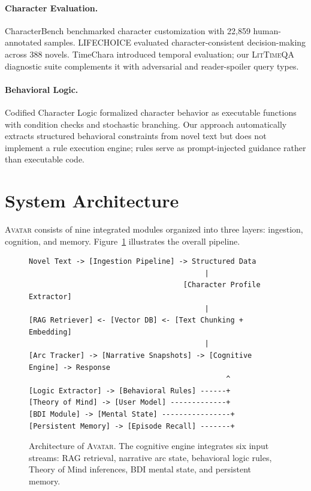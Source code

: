 \documentclass[11pt,a4paper]{article}
\begin{document}
\paragraph{Character Evaluation.}
CharacterBench \citep{characterbench2025} benchmarked character customization with 22,859 human-annotated samples.
LIFECHOICE \citep{lifechoice2024} evaluated character-consistent decision-making across 388 novels.
TimeChara \citep{ahn2024timechara} introduced temporal evaluation; our \textsc{LitTimeQA} diagnostic suite complements it with adversarial and reader-spoiler query types.

\paragraph{Behavioral Logic.}
Codified Character Logic \citep{codifiedlogic2025} formalized character behavior as executable functions with condition checks and stochastic branching.
Our approach automatically extracts structured behavioral constraints from novel text but does not implement a rule execution engine; rules serve as prompt-injected guidance rather than executable code.

\section{System Architecture}
\label{sec:architecture}

\textsc{Avatar} consists of nine integrated modules organized into three layers: ingestion, cognition, and memory.
Figure~\ref{fig:architecture} illustrates the overall pipeline.

\begin{figure}[t]
\centering
\small
\begin{verbatim}
Novel Text -> [Ingestion Pipeline] -> Structured Data
                                         |
                                    [Character Profile Extractor]
                                         |
[RAG Retriever] <- [Vector DB] <- [Text Chunking + Embedding]
                                         |
[Arc Tracker] -> [Narrative Snapshots] -> [Cognitive Engine] -> Response
                                              ^
[Logic Extractor] -> [Behavioral Rules] ------+
[Theory of Mind] -> [User Model] -------------+
[BDI Module] -> [Mental State] ----------------+
[Persistent Memory] -> [Episode Recall] -------+
\end{verbatim}
\caption{Architecture of \textsc{Avatar}. The cognitive engine integrates six input streams: RAG retrieval, narrative arc state, behavioral logic rules, Theory of Mind inferences, BDI mental state, and persistent memory.}
\label{fig:architecture}
\end{figure}
\end{document}
